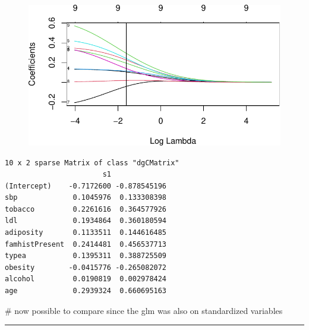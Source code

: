 \documentclass[
  letterpaper,
  DIV=11,
  numbers=noendperiod]{scrartcl}
\newenvironment{Shaded}{\begin{snugshade}}{\end{snugshade}}
\newcommand{\AttributeTok}[1]{\textcolor[rgb]{0.40,0.45,0.13}{#1}}
\newcommand{\CommentTok}[1]{\textcolor[rgb]{0.37,0.37,0.37}{#1}}
\newcommand{\FloatTok}[1]{\textcolor[rgb]{0.68,0.00,0.00}{#1}}
\newcommand{\FunctionTok}[1]{\textcolor[rgb]{0.28,0.35,0.67}{#1}}
\newcommand{\NormalTok}[1]{\textcolor[rgb]{0.00,0.23,0.31}{#1}}
\newcommand{\SpecialCharTok}[1]{\textcolor[rgb]{0.37,0.37,0.37}{#1}}
\begin{document}
\begin{figure}[H]

{\centering \includegraphics{L10_files/figure-pdf/unnamed-chunk-8-3.pdf}

}

\end{figure}

\begin{Shaded}
\end{Shaded}

\begin{verbatim}
10 x 2 sparse Matrix of class "dgCMatrix"
                       s1             
(Intercept)    -0.7172600 -0.878545196
sbp             0.1045976  0.133308398
tobacco         0.2261616  0.364577926
ldl             0.1934864  0.360180594
adiposity       0.1133511  0.144616485
famhistPresent  0.2414481  0.456537713
typea           0.1395311  0.388725509
obesity        -0.0415776 -0.265082072
alcohol         0.0190819  0.002978424
age             0.2939324  0.660695163
\end{verbatim}

\begin{Shaded}
\begin{Highlighting}[]
\CommentTok{\# now possible to compare since the glm was also on standardized variables}
\end{Highlighting}
\end{Shaded}

\begin{center}\rule{0.5\linewidth}{0.5pt}\end{center}
\end{document}
